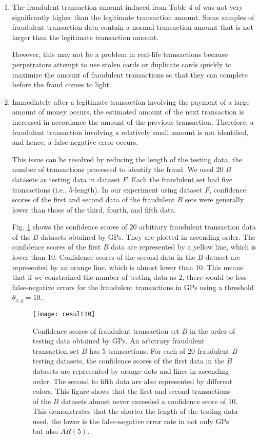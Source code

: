 \documentclass[final,authoryear,5p,times,twocolumn]{elsarticle}
\begin{document}
\begin{enumerate}
\item The fraudulent transaction amount induced from Table 4 of \citet{ref3} was not very significantly higher than the legitimate transaction amount. Some samples of fraudulent transaction data contain a normal transaction amount that is not larger than the legitimate transaction amount.

However, this may not be a problem in real-life transactions because perpetrators attempt to use stolen cards or duplicate cards quickly to maximize the amount of fraudulent transactions so that they can complete before the fraud comes to light.

\item Immediately after a legitimate transaction involving the payment of a large amount of money occurs, the estimated amount of the next transaction is increased in accordance the amount of the previous transaction. Therefore, a fraudulent transaction involving a relatively small amount is not identified, and hence, a false-negative error occurs.

This issue can be resolved by reducing the length of the testing data, the number of transactions processed to identify the fraud. We used 20 $B$ datasets as testing data in dataset $F$. Each the fraudulent set had five transactions (i.e., 5-length). In our experiment using dataset $F$, confidence scores of the first and second data of the fraudulent $B$ sets were generally lower than those of the third, fourth, and fifth data.

Fig. \ref{fig:result10} shows the confidence scores of 20 arbitrary fraudulent transaction data of the $B$ datasets obtained by GPs. They are plotted in ascending order. The confidence scores of the first $B$ data are represented by a yellow line, which is lower than 10. Confidence scores of the second data in the $B$ dataset are represented by an orange line, which is almost lower than 10. This means that if we constrained the number of testing data as 2, there would be less false-negative errors for the fraudulent transactions in GPs using a threshold $\theta_{x,y}=10$.

\begin{figure}[h!]
\begin{center}
\texttt{[image: result10]}
\caption{Confidence scores of fraudulent transaction set $B$ in the order of testing data obtained by GPs. An arbitrary fraudulent transaction set $B$ has 5 transactions. For each of 20 fraudulent $B$ testing datasets, the confidence scores of the first data in the $B$ datasets are represented by orange dots and lines in ascending order. The second to fifth data are also represented by different colors. This figure shows that the first and second transactions of the $B$ datasets almost never exceeded a confidence score of 10. This demonstrates that the shorter the length of the testing data used, the lower is the false-negative error rate in not only GPs but also $AR(5)$.}
\label{fig:result10}
\end{center}
\end{figure}


\end{enumerate}
\end{document}
